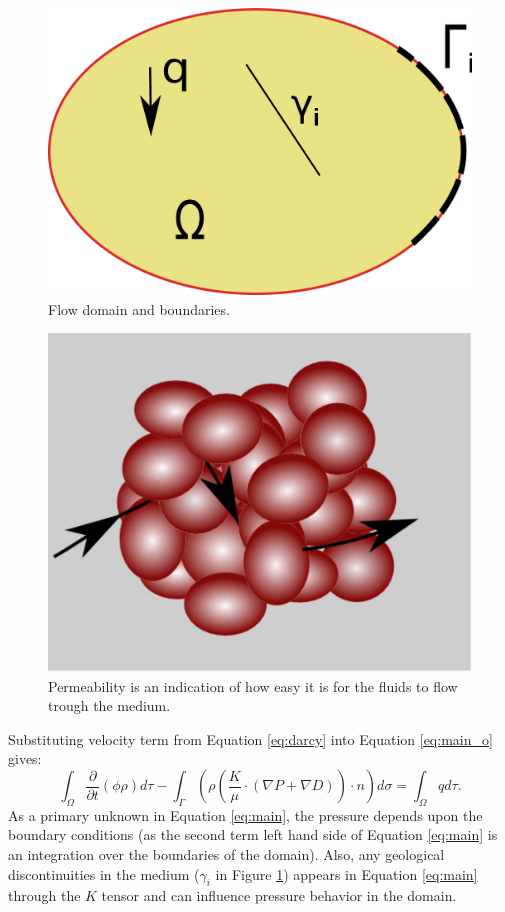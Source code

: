\begin{figure}[thb] 
  \centering{}
  \includegraphics[scale=0.3]{./figurer/BCPB}
  \caption{Flow domain and boundaries.}
  \label{fig:prsDmn}
\end{figure}

\begin{figure}
 \centering{}
 \includegraphics[width=0.35\linewidth]{./figurer/singlePerm}
 \caption{Permeability is an indication of how easy it is for the fluids to flow
trough the medium.}
 \label{fig:snglK}
\end{figure}

Substituting velocity term from Equation \ref{eq:darcy} into Equation
\ref{eq:main_o} gives:
\begin{equation}
  \int_{\Omega}\frac{\partial}{\partial t}(\phi\rho)d\tau-\int_{\Gamma}(\rho
(\frac{K}{\mu}\cdot (\nabla{P}+\nabla{D})) \cdot n)d\sigma=\int_{\Omega}qd\tau.
  \label{eq:main}
\end{equation} As a primary unknown in Equation \ref{eq:main}, the pressure depends upon the boundary conditions (as the second term left hand side of
Equation \ref{eq:main} is an integration over the boundaries of the domain). Also, any geological discontinuities in the medium
($\gamma_i$ in Figure \ref{fig:prsDmn}) appears in Equation \ref{eq:main} through the $K$ tensor and can influence pressure behavior in the domain.

